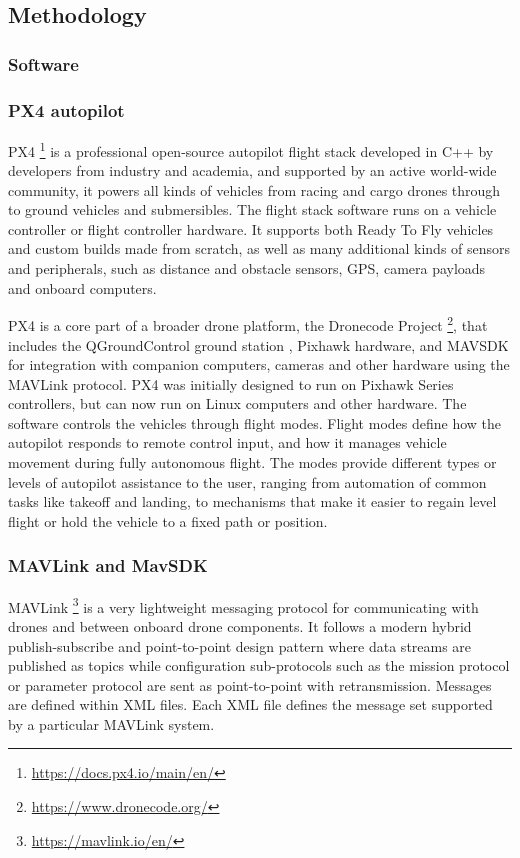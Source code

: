 \subsection{Methodology}


\subsubsection{Software}

\subsubsection{PX4 autopilot}
\label{subsec:px4}
PX4 \footnote{\url{https://docs.px4.io/main/en/}} is a professional open-source autopilot flight stack developed in C++ by developers from industry and academia, and supported by an active world-wide community,
it powers all kinds of vehicles from racing and cargo drones through to ground vehicles and submersibles.
The flight stack software runs on a vehicle controller or flight controller hardware. It supports both Ready To Fly vehicles and custom builds made from scratch,
as well as many additional kinds of sensors and peripherals, such as distance and obstacle sensors, GPS, camera payloads and onboard computers.

PX4 is a core part of a broader drone platform, the Dronecode Project \footnote{\url{https://www.dronecode.org/}}, that includes the QGroundControl ground station , Pixhawk hardware,
and MAVSDK for integration with companion computers, cameras and other hardware using the MAVLink protocol.
PX4 was initially designed to run on Pixhawk Series controllers, but can now run on Linux computers and other hardware.
The software controls the vehicles through flight modes. 
Flight modes define how the autopilot responds to remote control input, and how it manages vehicle movement during fully autonomous flight.
The modes provide different types or levels of autopilot assistance to the user, ranging from automation of common tasks like takeoff and landing, 
to mechanisms that make it easier to regain level flight or hold the vehicle to a fixed path or position.

\subsubsection{MAVLink and MavSDK}
\label{subsec:mavlink}
MAVLink \footnote{\url{https://mavlink.io/en/}} is a very lightweight messaging protocol for communicating with drones and between onboard drone components. 
It follows a modern hybrid publish-subscribe and point-to-point design pattern 
where data streams are published as topics while configuration sub-protocols 
such as the mission protocol or parameter protocol are sent as point-to-point with retransmission. 
Messages are defined within XML files. 
Each XML file defines the message set supported by a particular MAVLink system.

